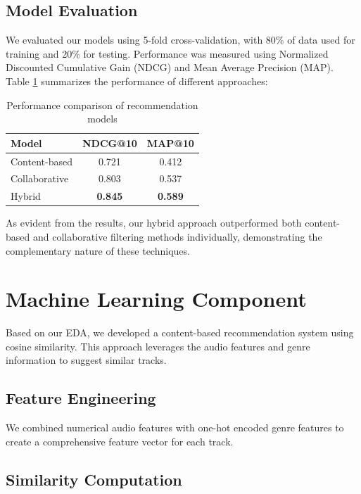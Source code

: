 \documentclass[runningheads]{llncs}
\begin{document}
\subsection{Model Evaluation}

We evaluated our models using 5-fold cross-validation, with 80\% of data used for training and 20\% for testing. Performance was measured using Normalized Discounted Cumulative Gain (NDCG) and Mean Average Precision (MAP). Table \ref{tab:model_performance} summarizes the performance of different approaches:

\begin{table}
\centering
\begin{tabular}{lcc}
\hline
Model & NDCG@10 & MAP@10 \\
\hline
Content-based & 0.721 & 0.412 \\
Collaborative & 0.803 & 0.537 \\
Hybrid & \textbf{0.845} & \textbf{0.589} \\
\hline
\end{tabular}
\caption{Performance comparison of recommendation models}
\label{tab:model_performance}
\end{table}

As evident from the results, our hybrid approach outperformed both content-based and collaborative filtering methods individually, demonstrating the complementary nature of these techniques.


\section{Machine Learning Component}

Based on our EDA, we developed a content-based recommendation system using cosine similarity. This approach leverages the audio features and genre information to suggest similar tracks.

\subsection{Feature Engineering}

We combined numerical audio features with one-hot encoded genre features to create a comprehensive feature vector for each track.

\subsection{Similarity Computation}
\end{document}
